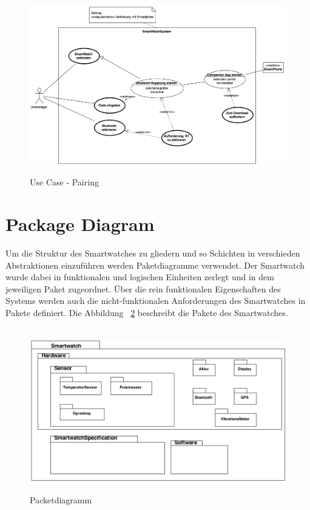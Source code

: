 \begin{figure}[H]
\centering\
\includegraphics[width=14cm]{img/usecase-pairing-p1}
\caption{Use Case - Pairing}\label{fig:usecase-pairing-p1}
\end{figure}



\section{Package Diagram}
Um die Struktur des Smartwatches zu gliedern und so Schichten in verschieden Abstraktionen
einzuführen werden Paketdiagramme verwendet.
Der Smartwatch wurde dabei in funktionalen und logischen Einheiten zerlegt und in dem jeweiligen Paket zugeordnet.
Über die rein funktionalen Eigenschaften des Systems werden auch die nicht-funktionalen Anforderungen des Smartwatches in Pakete definiert.
Die Abbildung ~\ref{fig:package} beschreibt die Pakete des Smartwatches.

\begin{figure}[h]
\centering\
\includegraphics[width=12cm]{img/PackagePhase1}
\caption{Packetdiagramm}\label{fig:package}
\end{figure}

